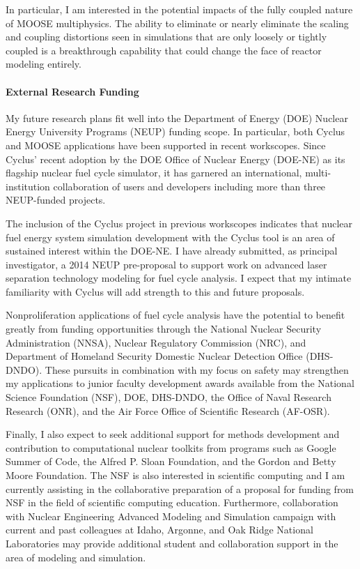 \documentclass[a4paper, 10pt]{article}
\begin{document}
In particular, I am interested in the potential impacts of the fully coupled 
nature of MOOSE multiphysics. The ability to eliminate or nearly eliminate the 
scaling and coupling distortions seen in simulations that are only loosely or 
tightly coupled is a breakthrough capability that could change the face of 
reactor modeling entirely.  

\paragraph{External Research Funding}
My future research plans fit well into the Department of Energy (DOE) Nuclear 
Energy University Programs (NEUP) funding scope. In particular, both Cyclus and 
MOOSE applications have been supported in recent workscopes. Since Cyclus' 
recent adoption by the DOE Office of Nuclear Energy (DOE-NE)  as its flagship 
nuclear fuel cycle simulator, it has garnered an international, 
multi-institution collaboration of users and developers including more than 
three NEUP-funded projects. 

The inclusion of the Cyclus project in previous workscopes indicates that 
nuclear fuel energy system simulation development with the Cyclus tool is an 
area of sustained interest within the DOE-NE.  I have already submitted, as 
principal investigator, a 2014 NEUP pre-proposal to support work on advanced 
laser separation technology modeling for fuel cycle analysis.  I expect that my 
intimate familiarity with Cyclus will add strength to this and future proposals.  

Nonproliferation applications of fuel cycle analysis have the potential to benefit greatly from funding 
opportunities through the National Nuclear Security Administration (NNSA), 
Nuclear Regulatory Commission (NRC), and Department of Homeland Security 
Domestic Nuclear Detection Office (DHS-DNDO). These pursuits in combination with 
my focus on safety may  strengthen my applications to junior faculty development 
awards available from the National Science Foundation (NSF), DOE, DHS-DNDO, the 
Office of Naval Research Research (ONR), and the Air Force Office of Scientific 
Research (AF-OSR).

Finally, I also expect to seek additional support for methods development and 
contribution to computational nuclear toolkits from programs such as Google 
Summer of Code, the Alfred P. Sloan Foundation, and the Gordon and Betty Moore 
Foundation.  The NSF is also interested in 
scientific computing and I am currently assisting in the collaborative preparation 
of a proposal for funding from NSF in the field of scientific computing 
education. Furthermore, collaboration with Nuclear Engineering Advanced 
Modeling and Simulation campaign with current and past colleagues at Idaho, 
Argonne, and Oak Ridge National Laboratories may provide additional student and 
collaboration support in the area of modeling and simulation. 
\end{document}
